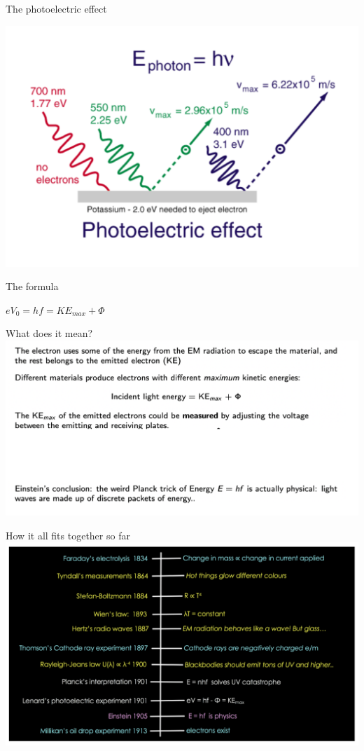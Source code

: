 \begin{frame}{The photoelectric effect}
\small
\begin{center}
\includegraphics[scale=0.4]{ehf}
\end{center}
\end{frame}


\begin{frame}{The formula}
\Huge
\begin{center}
$eV_{0} = hf = KE_{max} + \Phi$
\end{center}
\end{frame}

\begin{frame}{What does it mean?}
\small
\includegraphics[scale=0.4]{observe-meaning}
\end{frame}


\begin{frame}{How it all fits together so far}
\small
\includegraphics[scale=0.4]{sofar}
\end{frame}

